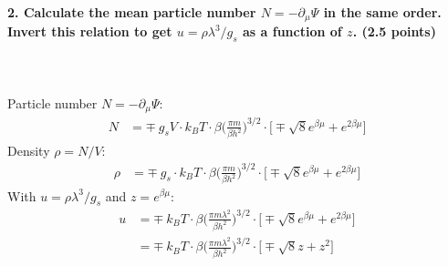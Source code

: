 \paragraph{2. Calculate the mean particle number 
    $N =-\partial_\mu\Psi$ in the same order. Invert this 
    relation to get $u=\rho\lambda^3/g_s$ as a function of $z$. 
    (2.5 points)
} \ \\
    \\
    Particle number $N=-\partial_\mu\Psi$:
    \begin{align}
        N
        &=\mp\ g_sV\cdot k_BT\cdot\beta\bigg(
            \frac{\pi m}{\beta h^2}
        \bigg)^{3/2}\cdot\bigg[
            \mp\sqrt{8}e^{\beta\mu}
            +e^{2\beta\mu}
        \bigg]
    \end{align}
    Density $\rho=N/V$:
    \begin{align}
        \rho&=\mp\ g_s\cdot k_BT\cdot\beta\bigg(
            \frac{\pi m}{\beta h^2}
        \bigg)^{3/2}\cdot\bigg[
            \mp\sqrt{8}e^{\beta\mu}
            +e^{2\beta\mu}
        \bigg]
    \end{align}
    With $u=\rho\lambda^3/g_s$ and $z=e^{\beta\mu}$:
    \begin{align}
        u
        &=\mp\ k_BT\cdot\beta\bigg(
            \frac{\pi m\lambda^2}{\beta h^2}
        \bigg)^{3/2}\cdot\bigg[
            \mp\sqrt{8}e^{\beta\mu}
            +e^{2\beta\mu}
        \bigg] \\
        &=\mp\ k_BT\cdot\beta\bigg(
            \frac{\pi m\lambda^2}{\beta h^2}
        \bigg)^{3/2}\cdot\bigg[
            \mp\sqrt{8}z
            +z^2
        \bigg]
    \end{align}

